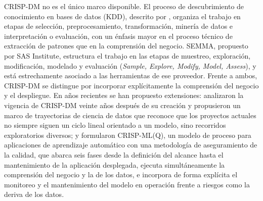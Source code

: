 CRISP-DM no es el único marco disponible. El proceso de descubrimiento de conocimiento en
bases de datos (KDD), descrito por \textcite{fayyad1996}, organiza el trabajo en etapas de
selección, preprocesamiento, transformación, minería de datos e interpretación o evaluación,
con un énfasis mayor en el proceso técnico de extracción de patrones que en la comprensión
del negocio. SEMMA, propuesto por SAS Institute, estructura el trabajo en las etapas de
muestreo, exploración, modificación, modelado y evaluación (\textit{Sample, Explore, Modify,
Model, Assess}), y está estrechamente asociado a las herramientas de ese proveedor. Frente a
ambos, CRISP-DM se distingue por incorporar explícitamente la comprensión del negocio y el
despliegue. En años recientes se han propuesto extensiones: \textcite{martinez2021}
analizaron la vigencia de CRISP-DM veinte años después de su creación y propusieron un marco
de trayectorias de ciencia de datos que reconoce que los proyectos actuales no siempre
siguen un ciclo lineal orientado a un modelo, sino recorridos exploratorios diversos; y
\textcite{studer2021} formularon CRISP-ML(Q), un modelo de proceso para aplicaciones de
aprendizaje automático con una metodología de aseguramiento de la calidad, que abarca seis
fases desde la definición del alcance hasta el mantenimiento de la aplicación desplegada,
ejecuta simultáneamente la comprensión del negocio y la de los datos, e incorpora de forma
explícita el monitoreo y el mantenimiento del modelo en operación frente a riesgos como la
deriva de los datos.

